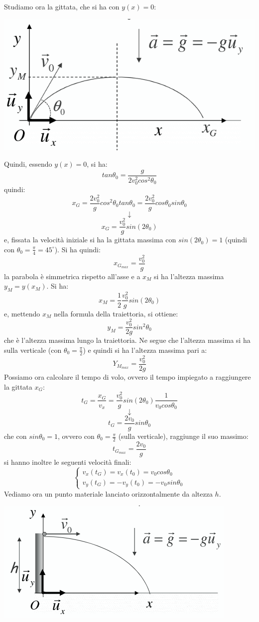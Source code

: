 \documentclass[a4paper,12pt, oneside]{book}
\begin{document}
\newpage
Studiamo ora la gittata, che si ha con $y(x)=0$:
\begin{center}
	\includegraphics[scale=0.4]{img/par3.png}
\end{center}
Quindi, essendo $y(x)=0$, si ha:
$$tan\theta_0=\frac{g}{2v_0^2cos^2\theta_0}$$
quindi:
$$x_G=\frac{2v_0^2}{g}cos^2\theta_0 tan\theta_0=\frac{2v_0^2}{g}cos\theta_0 sin\theta_0$$
$$\downarrow$$
$$x_G=\frac{v_0^2}{g}sin(2\theta_0)$$
e, fissata la velocità iniziale si ha la gittata massima con $sin(2\theta_0)=1$ (quindi con $\theta_0=\frac{\pi}{4}=45^{\circ}$). Si ha quindi:
$$x_{G_{max}}=\frac{v_0^2}{g}$$
la parabola è simmetrica rispetto all'asse e a $x_M$ si ha l'altezza massima $y_M=y(x_M)$. Si ha:
$$x_M=\frac{1}{2}\frac{v_0^2}{g}sin(2\theta_0)$$
e, mettendo $x_M$ nella formula della traiettoria, si ottiene:
$$y_M=\frac{v_0^2}{2g}sin^2\theta_0$$
che è l'altezza massima lungo la traiettoria.
Ne segue che l'altezza massima si ha sulla verticale (con $\theta_0=\frac{\pi}{2}$) e quindi si ha l'altezza massima pari a:
$$Y_{M_{max}}=\frac{v_0^2}{2g}$$
Possiamo ora calcolare il tempo di volo, ovvero il tempo impiegato a raggiungere la gittata $x_G$:
$$t_G=\frac{x_G}{v_x}=\frac{v_0^2}{g}sin(2\theta_0)\frac{1}{v_0cos\theta_0}$$
$$\downarrow$$
$$t_G=\frac{2v_0}{g}sin\theta_0$$
che con $sin\theta_0=1$, ovvero con $\theta_0=\frac{\pi}{2}$ (sulla verticale), raggiunge il suo massimo:
$$t_{G_{max}}=\frac{2v_0}{g}$$
si hanno inoltre le seguenti velocità finali:
$$\begin{cases}
		v_x(t_G)=v_x(t_0)=v_0cos\theta_0 \\
		v_y(t_G)=-v_y(t_0)=-v_0sin\theta_0
	\end{cases}$$
Vediamo ora un punto materiale lanciato orizzontalmente da altezza $h$.
\begin{center}
	\includegraphics[scale=0.6]{img/ori.png}
\end{center}
\end{document}
